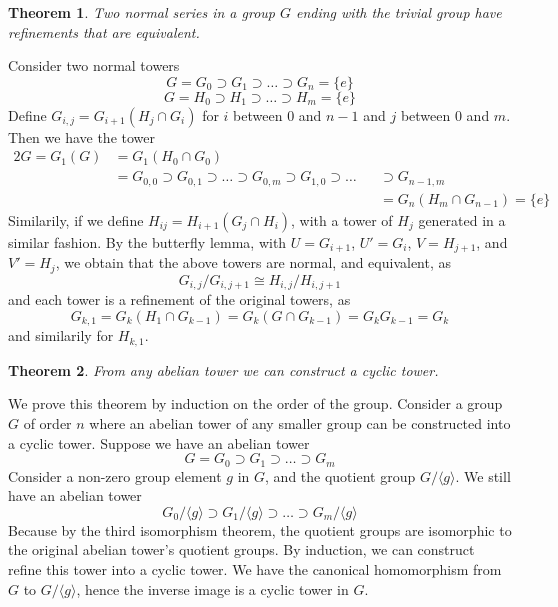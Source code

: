 \documentclass[12pt]{amsbook}
\makeatletter
\theoremstyle{plain}
\newtheorem{theorem}{Theorem}[chapter]
\theoremstyle{definition}
\renewenvironment{proof}[1][\proofname]{\par
  \pushQED{\qed}%
  \normalfont \topsep6\p@\@plus6\p@\relax
  \list{}{\leftmargin=0em
          \rightmargin=\leftmargin
          \settowidth{\itemindent}{\itshape#1}%
          \labelwidth=\itemindent}

  \item[\hskip\labelsep
        \itshape
    #1\@addpunct{.}]\ignorespaces
}{%
  \popQED\endlist\@endpefalse
}
\makeatother
\begin{document}
\begin{theorem}
    Two normal series in a group $G$ ending with the trivial group have refinements that are equivalent.
\end{theorem}
\begin{proof}
    Consider two normal towers
    \[ G = G_0 \supset G_1 \supset \dots \supset G_n = \{ e \} \]
    \[ G = H_0 \supset H_1 \supset \dots \supset H_m = \{ e \} \]
    Define $G_{i,j} = G_{i+1}(H_j \cap G_i)$ for $i$ between 0 and $n-1$ and $j$ between 0 and $m$. Then we have the tower
    \begin{alignat*}{2}
    G = G_1(G) &= G_1(H_0 \cap G_0) &\\
               &= G_{0,0} \supset G_{0,1} \supset \dots \supset G_{0,m} \supset G_{1,0} \supset \dots &&\supset G_{n-1,m}\\
                &           &&= G_n(H_m \cap G_{n-1}) = \{ e \}
    \end{alignat*}
    Similarily, if we define $H_{ij} = H_{i+1}(G_j \cap H_i)$, with a tower of $H_j$ generated in a similar fashion. By the butterfly lemma, with $U = G_{i+1}$, $U' = G_i$, $V = H_{j+1}$, and $V' = H_j$, we obtain that the above towers are normal, and equivalent, as
    \[ G_{i,j}/G_{i,j+1} \cong H_{i,j}/H_{i,j+1} \]
    and each tower is a refinement of the original towers, as
    \[ G_{k,1} = G_k(H_1 \cap G_{k-1}) = G_k(G \cap G_{k-1}) = G_kG_{k-1} = G_k \]
    and similarily for $H_{k,1}$.
\end{proof}

\begin{theorem}
    From any abelian tower we can construct a cyclic tower.
\end{theorem}
\begin{proof}
    We prove this theorem by induction on the order of the group. Consider a group $G$ of order $n$ where an abelian tower of any smaller group can be constructed into a cyclic tower. Suppose we have an abelian tower
    \[ G = G_0 \supset G_1 \supset \dots \supset G_m \]
    Consider a non-zero group element $g$ in $G$, and the quotient group $G/\langle g \rangle$. We still have an abelian tower
    \[ G_0/\langle g \rangle \supset G_1/\langle g \rangle \supset \dots \supset G_m/\langle g \rangle \]
    Because by the third isomorphism theorem, the quotient groups are isomorphic to the original abelian tower's quotient groups. By induction, we can construct refine this tower into a cyclic tower. We have the canonical homomorphism from $G$ to $G/\langle g \rangle$, hence the inverse image is a cyclic tower in $G$.
\end{proof}
\end{document}
